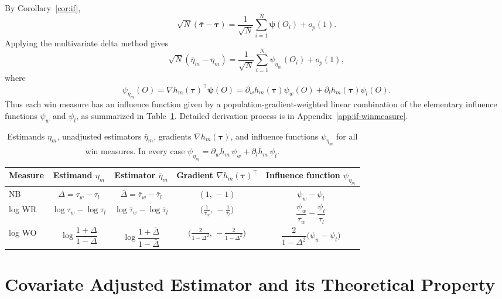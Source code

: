 \documentclass[11pt,a4paper]{article}
\begin{document}
By Corollary~\ref{cor:if},
\[
 \sqrt N(\bar{\boldsymbol\tau}-\boldsymbol\tau)
=
\frac1{\sqrt N}\sum_{i=1}^N\boldsymbol\psi(O_i)+o_p(1).
\]
Applying the multivariate delta method gives
\begin{equation}
    \sqrt N(\bar\eta_m-\eta_m)
=
\frac1{\sqrt N}\sum_{i=1}^N\psi_{\eta_m}(O_i)+o_p(1),
\end{equation}
where
\begin{equation}
\psi_{\eta_m}(O)
=
\nabla h_m(\boldsymbol\tau)^\top\boldsymbol\psi(O)
=
\partial_w h_m(\boldsymbol\tau)\psi_w(O)
+
\partial_l h_m(\boldsymbol\tau)\psi_l(O).
\end{equation}
Thus each win measure has an influence function given by a population-gradient-weighted linear combination of the elementary influence functions \(\psi_w\) and \(\psi_l\), as summarized in Table~\ref{tab:if_summary}. Detailed derivation process is in Appendix~\ref{app:if-winmeasure}.

\begin{table}[h]
\centering
\small
\caption{Estimands $\eta_m$, unadjusted estimators $\bar\eta_m$, gradients $\nabla h_m(\boldsymbol\tau)$, and influence functions  $\psi_{\eta_m}$ for all win
measures. In every case $\psi_{\eta_m}=\partial_w h_m\,\psi_w+\partial_l h_m\,\psi_l$.}
\label{tab:if_summary}
\renewcommand{\arraystretch}{2.2}
\begin{tabular}{lcccc}
\toprule
\textbf{Measure} & \textbf{Estimand $\eta_m$} & \textbf{Estimator $\bar\eta_m$}
  & \textbf{Gradient $\nabla h_m(\boldsymbol\tau)^\top$} & \textbf{Influence function $\psi_{\eta_m}$}\\
\midrule
NB
  & $\Delta = \tau_w-\tau_l$
  & $\bar\Delta=\bar\tau_w-\bar\tau_l$
  & $(1,\,-1)$
  & $\psi_w-\psi_l$ \\
log WR
  & $\log\tau_w-\log\tau_l$
  & $\log\bar\tau_w-\log\bar\tau_l$
  & $\bigl(\tfrac{1}{\tau_w},\,-\tfrac{1}{\tau_l}\bigr)$
  & $\dfrac{\psi_w}{\tau_w}-\dfrac{\psi_l}{\tau_l}$ \\
log WO
  & $\log\dfrac{1+\Delta}{1-\Delta}$
  & $\log\dfrac{1+\bar\Delta}{1-\bar\Delta}$
  & $\bigl(\tfrac{2}{1-\Delta^2},\,-\tfrac{2}{1-\Delta^2}\bigr)$
  & $\dfrac{2}{1-\Delta^2}\bigl(\psi_w-\psi_l\bigr)$ \\
\bottomrule
\end{tabular}
\end{table}

\section{Covariate Adjusted Estimator and its Theoretical Property}\label{sec:Adjusted}
\end{document}

